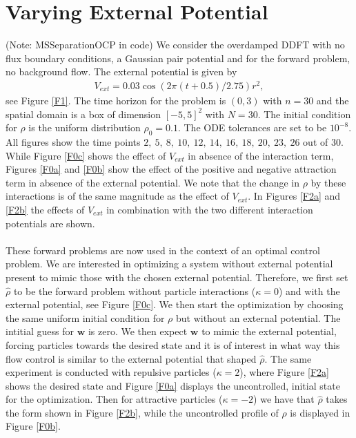 \documentclass[11pt, a4paper]{article}
\theoremstyle{definition}
\newcommand{\w}{\mathbf{w}}
\newcommand{\hr}{\widehat \rho}
\begin{document}
\section{Varying External Potential} \label{sec:VaryExPotential}
(Note: MSSeparationOCP in code)
We consider the overdamped DDFT with no flux boundary conditions, a Gaussian pair potential and for the forward problem, no background flow. 
The external potential is given by
\begin{align*}
	V_{ext} = 0.03 \cos(2\pi (t + 0.5)/2.75)r^2,
\end{align*}
see Figure \ref{F1}. The time horizon for the problem is $(0,3)$ with $n = 30$ and the spatial domain is a box of dimension $[-5,5]^2$ with $N = 30$. The initial condition for $\rho$ is the uniform distribution $\rho_0 = 0.1$. The ODE tolerances are set to be $10^{-8}$. All figures show the time points $2,\  5,\ 8,\  10,\ 12,\ 14,\ 16,\ 18,\ 20,\ 23,\ 26$ out of $30$.
While Figure \ref{F0c} shows the effect of $V_{ext}$ in absence of the interaction term, Figures \ref{F0a} and \ref{F0b} show the effect of the positive and negative attraction term in absence of the external potential. We note that the change in $\rho$ by these interactions is of the same magnitude as the effect of $V_{ext}$. In Figures \ref{F2a} and \ref{F2b} the effects of $V_{ext}$ in combination with the two different interaction potentials are shown. 
\\
\\
These forward problems are now used in the context of an optimal control problem. We are interested in optimizing a system without external potential present to mimic those with the chosen external potential. Therefore, we first set $\hr$ to be the forward problem without particle interactions ($\kappa =0$) and with the external potential, see Figure \ref{F0c}. We then start the optimization by choosing the same uniform initial condition for $\rho$ but without an external potential. The intitial guess for $\w$ is zero. We then expect $\w$ to mimic the external potential, forcing particles towards the desired state and it is of interest in what way this flow control is similar to the external potential that shaped $\hr$.
The same experiment is conducted with repulsive particles ($\kappa = 2$), where Figure \ref{F2a} shows the desired state and Figure \ref{F0a} displays the uncontrolled, initial state for the optimization. Then for attractive particles ($\kappa = -2$) we have that $\hr$ takes the form shown in Figure \ref{F2b}, while the uncontrolled profile of $\rho$ is displayed in Figure \ref{F0b}.\\
\end{document}
